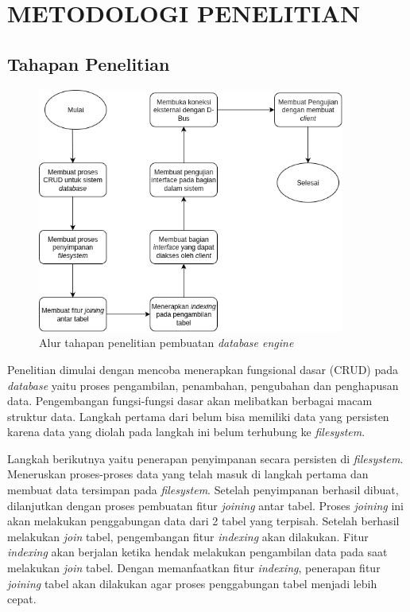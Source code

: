 

\chapter{METODOLOGI PENELITIAN}

\section{Tahapan Penelitian}

\begin{figure}[H]
  \centering{}
	\includegraphics[width=0.9\textwidth]{gambar/bab4/Tahapan-Penelitian-Baru}
  \caption{Alur tahapan penelitian pembuatan \emph{database engine}}
\end{figure}

Penelitian dimulai dengan mencoba menerapkan fungsional dasar (CRUD) pada \emph{database} yaitu proses pengambilan,
penambahan, pengubahan dan penghapusan data. Pengembangan fungsi-fungsi dasar akan melibatkan berbagai macam struktur
data. Langkah pertama dari belum bisa memiliki data yang persisten karena data yang diolah pada langkah ini belum 
terhubung ke \emph{filesystem}.

Langkah berikutnya yaitu penerapan penyimpanan secara persisten di \emph{filesystem}. Meneruskan proses-proses data yang telah
masuk di langkah pertama dan membuat data tersimpan pada \emph{filesystem}. Setelah penyimpanan berhasil dibuat, dilanjutkan dengan proses pembuatan
fitur \emph{joining} antar tabel. Proses \emph{joining} ini akan melakukan penggabungan data dari 2 tabel yang terpisah. Setelah berhasil melakukan \emph{join} tabel, pengembangan fitur \emph{indexing}
akan dilakukan. Fitur \emph{indexing} akan berjalan ketika hendak melakukan pengambilan data pada saat melakukan \emph{join} tabel. Dengan memanfaatkan fitur \emph{indexing},
penerapan fitur \emph{joining} tabel akan dilakukan agar proses penggabungan tabel menjadi lebih cepat.


